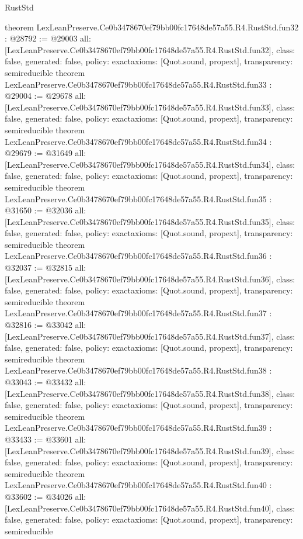 \begin{lexlean}{RustStd}
\begin{coremodule}
{}
theorem LexLeanPreserve.Ce0b3478670ef79bb00fc17648de57a55.R4.RustStd.fun32 : @28792 := @29003 {
  all: [LexLeanPreserve.Ce0b3478670ef79bb00fc17648de57a55.R4.RustStd.fun32],
  class: false,
  generated: false,
  policy: exact{axioms: [Quot.sound, propext]},
  transparency: semireducible
}
theorem LexLeanPreserve.Ce0b3478670ef79bb00fc17648de57a55.R4.RustStd.fun33 : @29004 := @29678 {
  all: [LexLeanPreserve.Ce0b3478670ef79bb00fc17648de57a55.R4.RustStd.fun33],
  class: false,
  generated: false,
  policy: exact{axioms: [Quot.sound, propext]},
  transparency: semireducible
}
theorem LexLeanPreserve.Ce0b3478670ef79bb00fc17648de57a55.R4.RustStd.fun34 : @29679 := @31649 {
  all: [LexLeanPreserve.Ce0b3478670ef79bb00fc17648de57a55.R4.RustStd.fun34],
  class: false,
  generated: false,
  policy: exact{axioms: [Quot.sound, propext]},
  transparency: semireducible
}
theorem LexLeanPreserve.Ce0b3478670ef79bb00fc17648de57a55.R4.RustStd.fun35 : @31650 := @32036 {
  all: [LexLeanPreserve.Ce0b3478670ef79bb00fc17648de57a55.R4.RustStd.fun35],
  class: false,
  generated: false,
  policy: exact{axioms: [Quot.sound, propext]},
  transparency: semireducible
}
theorem LexLeanPreserve.Ce0b3478670ef79bb00fc17648de57a55.R4.RustStd.fun36 : @32037 := @32815 {
  all: [LexLeanPreserve.Ce0b3478670ef79bb00fc17648de57a55.R4.RustStd.fun36],
  class: false,
  generated: false,
  policy: exact{axioms: [Quot.sound, propext]},
  transparency: semireducible
}
theorem LexLeanPreserve.Ce0b3478670ef79bb00fc17648de57a55.R4.RustStd.fun37 : @32816 := @33042 {
  all: [LexLeanPreserve.Ce0b3478670ef79bb00fc17648de57a55.R4.RustStd.fun37],
  class: false,
  generated: false,
  policy: exact{axioms: [Quot.sound, propext]},
  transparency: semireducible
}
theorem LexLeanPreserve.Ce0b3478670ef79bb00fc17648de57a55.R4.RustStd.fun38 : @33043 := @33432 {
  all: [LexLeanPreserve.Ce0b3478670ef79bb00fc17648de57a55.R4.RustStd.fun38],
  class: false,
  generated: false,
  policy: exact{axioms: [Quot.sound, propext]},
  transparency: semireducible
}
theorem LexLeanPreserve.Ce0b3478670ef79bb00fc17648de57a55.R4.RustStd.fun39 : @33433 := @33601 {
  all: [LexLeanPreserve.Ce0b3478670ef79bb00fc17648de57a55.R4.RustStd.fun39],
  class: false,
  generated: false,
  policy: exact{axioms: [Quot.sound, propext]},
  transparency: semireducible
}
theorem LexLeanPreserve.Ce0b3478670ef79bb00fc17648de57a55.R4.RustStd.fun40 : @33602 := @34026 {
  all: [LexLeanPreserve.Ce0b3478670ef79bb00fc17648de57a55.R4.RustStd.fun40],
  class: false,
  generated: false,
  policy: exact{axioms: [Quot.sound, propext]},
  transparency: semireducible
}
\end{coremodule}
\end{lexlean}
